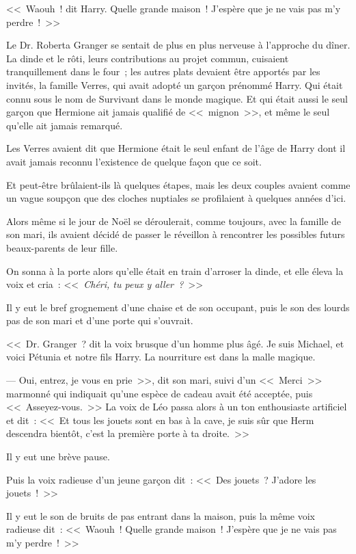 <<~Waouh~! dit Harry. Quelle grande maison~! J'espère que je ne vais pas m'y perdre~!~>>

\later

Le Dr. Roberta Granger se sentait de plus en plus nerveuse à l'approche du dîner. La dinde et le rôti, leurs contributions au projet commun, cuisaient tranquillement dans le four~; les autres plats devaient être apportés par les invités, la famille Verres, qui avait adopté un garçon prénommé Harry. Qui était connu sous le nom de Survivant dans le monde magique. Et qui était aussi le seul garçon que Hermione ait jamais qualifié de <<~mignon~>>, et même le seul qu'elle ait jamais remarqué.

Les Verres avaient dit que Hermione était le seul enfant de l'âge de Harry dont il avait jamais reconnu l'existence de quelque façon que ce soit.

Et peut-être brûlaient-ils là quelques étapes, mais les deux couples avaient comme un vague soupçon que des cloches nuptiales se profilaient à quelques années d'ici.

Alors même si le jour de Noël se déroulerait, comme toujours, avec la famille de son mari, ils avaient décidé de passer le réveillon à rencontrer les possibles futurs beaux-parents de leur fille.

On sonna à la porte alors qu'elle était en train d'arroser la dinde, et elle éleva la voix et cria~: <<~\emph{Chéri, tu peux y aller~?}~>>

Il y eut le bref grognement d'une chaise et de son occupant, puis le son des lourds pas de son mari et d'une porte qui s'ouvrait.

<<~Dr. Granger~? dit la voix brusque d'un homme plus âgé. Je suis Michael, et voici Pétunia et notre fils Harry. La nourriture est dans la malle magique.

--- Oui, entrez, je vous en prie~>>, dit son mari, suivi d'un <<~Merci~>> marmonné qui indiquait qu'une espèce de cadeau avait été acceptée, puis <<~Asseyez-vous.~>> La voix de Léo passa alors à un ton enthousiaste artificiel et dit~: <<~Et tous les jouets sont en bas à la cave, je suis sûr que Herm descendra bientôt, c'est la première porte à ta droite.~>>

Il y eut une brève pause.

Puis la voix radieuse d'un jeune garçon dit~: <<~Des jouets~? J'adore les jouets~!~>>

Il y eut le son de bruits de pas entrant dans la maison, puis la même voix radieuse dit~: <<~Waouh~! Quelle grande maison~! J'espère que je ne vais pas m'y perdre~!~>>

